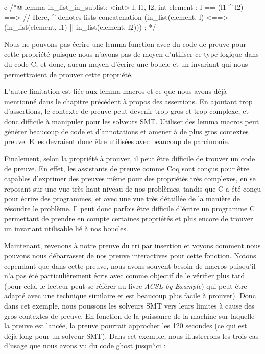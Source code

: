 \begin{CodeBlock}{c}
/*@
  lemma in_list_in_sublist:
    \forall \list<int> l, l1, l2, int element ;
      l == (l1 ^ l2) ==>      // Here, ^ denotes lists concatenation
      (in_list(element, l) <==> (in_list(element, l1) || in_list(element, l2))) ;
*/
\end{CodeBlock}


Nous ne pouvons pas écrire une lemma function avec du code de preuve pour cette
propriété puisque nous n'avons pas de moyen d'utiliser ce type logique dans du
code C, et donc, aucun moyen d'écrire une boucle et un invariant qui nous 
permettraient de prouver cette propriété.


L'autre limitation est liée aux lemma macros et ce que nous avons déjà mentionné
dans le chapitre précédent à propos des assertions. En ajoutant trop d'assertions,
le contexte de preuve peut devenir trop gros et trop complexe, et donc difficile à
manipuler pour les solveurs SMT. Utiliser des lemma macros peut générer beaucoup
de code et d'annotations et amener à de plus gros contextes preuve. Elles devraient
donc être utilisées avec beaucoup de parcimonie.


Finalement, selon la propriété à prouver, il peut être difficile de trouver un
code de preuve. En effet, les assistants de preuve comme Coq sont conçus pour
être capables d'exprimer des preuves même pour des propriétés très complexes,
en se reposant sur une vue très haut niveau de nos problèmes, tandis que C a été
conçu pour écrire des programmes, et avec une vue très détaillée de la manière de
résoudre le problème. Il peut donc parfois être difficile d'écrire un programme
C permettant de prendre en compte certaines propriétés et plus encore de trouver
un invariant utilisable lié à nos boucles.




Maintenant, revenons à notre preuve du tri par insertion et voyons comment nous
pouvons nous débarrasser de nos preuve interactives pour cette fonction. Notons
cependant que dans cette preuve, nous avons souvent besoin de macros puisqu'il
n'a pas été particulièrement écris avec comme objectif de le vérifier plus tard
(pour cela, le lecteur peut se référer au livre {\em ACSL by Example}) qui peut être
adapté avec une technique similaire et est beaucoup plus facile à prouver). Donc
dans cet exemple, nous poussons les solveurs SMT vers leurs limites à cause des
gros contextes de preuve. En fonction de la puissance de la machine sur laquelle
la preuve est lancée, la preuve pourrait approcher les 120 secondes (ce qui est
déjà long pour un solveur SMT). Dans cet exemple, nous illustrerons les trois
cas d'usage que nous avons vu du code ghost jusqu'ici :


